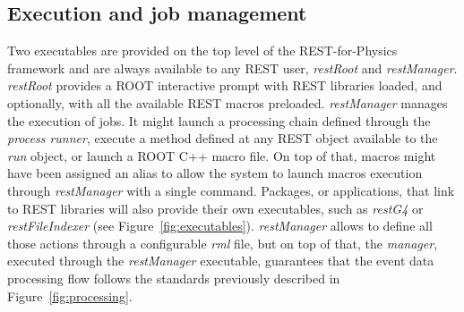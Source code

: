 

\subsection{Execution and job management}
Two executables are provided on the top level of the REST-for-Physics framework and are always available to any REST user, \emph{restRoot} and \emph{restManager}. 
\emph{restRoot} provides a ROOT interactive prompt with REST libraries loaded, and optionally, with all the available REST macros preloaded. 
\emph{restManager} manages the execution of jobs. It might launch a processing chain defined through the \emph{process runner}, execute a method defined at any REST object available to the \emph{run} object, or launch a ROOT C++ macro file. On top of that, macros might have been assigned an alias to allow the system to launch macros execution through \emph{restManager} with a single command. Packages, or applications, that link to REST libraries will also provide their own executables, such as \emph{restG4} or \emph{restFileIndexer}  (see Figure~\ref{fig:executables}). \emph{restManager} allows to define all those actions through a configurable \emph{rml} file, but on top of that, the \emph{manager}, executed through the \emph{restManager} executable, guarantees that the event data processing flow follows the standards previously described in Figure~\ref{fig:processing}.

